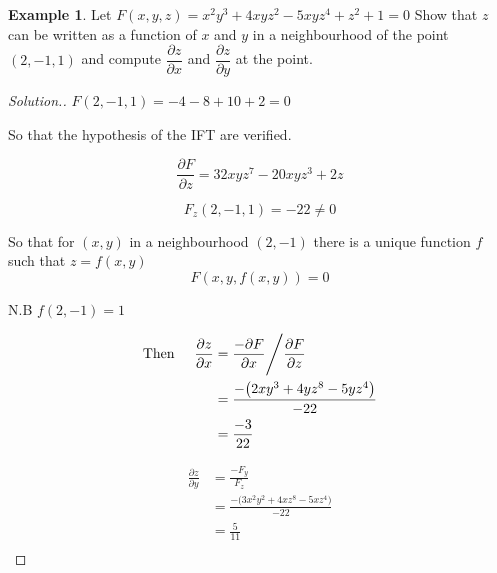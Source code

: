 \documentclass[11pt,a4paper]{article}
\theoremstyle{definition}
\newtheorem{exa}[thm]{Example}
\newenvironment{solution}
  {\renewcommand{\qedsymbol}{}\begin{proof}[\textit{Solution}.]}
  {\end{proof}}
\begin{document}
\begin{exa}


Let $F(x,y,z) = x^2y^3 + 4xyz^2 - 5xyz^4 + z^2 + 1 = 0$
Show that $z$ can be written as a function of $x$ and $y$  in a neighbourhood of the point $(2,-1,1)$ and compute $\dfrac{\partial z}{\partial x}$ and $\dfrac{\partial z}{\partial y}$ at the point.
\end{exa}


\begin{solution}


$F(2,-1,1) = -4-8+10+2 =0$


So that the hypothesis of the IFT are verified.

$$\frac{\partial F}{\partial z} = 32xyz^7 - 20xyz^3 + 2z$$

$$F_z(2,-1,1) = -22 \neq 0$$

So that for $(x,y)$ in a neighbourhood $(2,-1)$ there is a unique function $f$ such that $z=f(x,y)$ $$F(x,y,f(x,y)) =0$$

N.B $f(2,-1) = 1$

\begin{align*}
\text{Then}\hspace{0.5cm} \frac{\partial z}{\partial x} & = \frac{-\partial F}{\partial x}\Bigg/ \frac{\partial F}{\partial z}\\
& =\frac{-\big(2xy^3 + 4yz^8 -5yz^4\big)}{-22}\\
& = \frac{-3}{22}\\
\end{align*}

\begin{align*}
\frac{\partial z}{\partial y} & = \frac{-F_y}{F_z}\\
& = \frac{-\big(3x^2y^2 + 4xz^8 - 5xz^4\big)}{-22}\\
& = \frac{5}{11}\\
\end{align*}
\end{solution}
\end{document}
